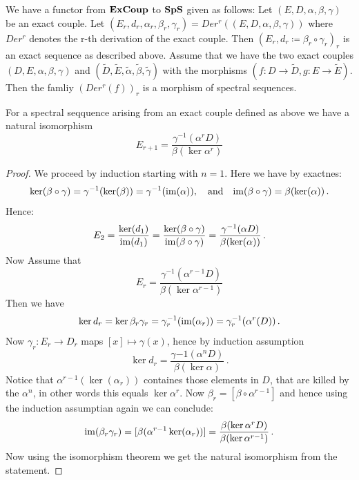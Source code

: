 \begin{corollary}
	We have a functor from $\operatorname{\mathbf{ExCoup}}$ to $\operatorname{\mathbf{SpS}}$ given as follows: Let $(E,D,\alpha,\beta,\gamma)$ be an exact couple. Let $(E_r,d_r,\alpha_r,\beta_r,\gamma_r)=Der^r((E,D,\alpha,\beta,\gamma))$ where $Der^r$ denotes the r-th derivation of the exact couple. Then $(E_r,d_r\coloneq \beta_r\circ \gamma_r)_r$ is an exact sequence as described above. Assume that we have the two exact couples $(D,E,\alpha,\beta,\gamma)$ and $(\widetilde{D},\widetilde{E},\widetilde{\alpha},\widetilde{\beta},\widetilde{\gamma})$ with the morphisms $(f:D\to \widetilde{D},g:E\to \widetilde{E})$. Then the famliy $(Der^r(f))_r$ is a morphism of spectral sequences.
\end{corollary}
\begin{corollary}\label{cor: explicit pages of exact sequences arising from exact couples}
	For a spectral seqquence arising from an exact couple defined as above we have a natural isomorphism
	\begin{equation*}
		E_{r+1}= \frac{\gamma^{-1}(\alpha^r D)}{\beta(\ker \alpha ^r)}
	\end{equation*}
\end{corollary}
\begin{proof}
	We proceed by induction starting with $n=1$.
	Here we have by exactnes:
	\begin{equation*}
		\ker(\beta \circ \gamma)=\gamma^{-1}(\ker(\beta))=\gamma^{-1}(\mathrm{im}(\alpha)),\quad \text{and}\quad
		\mathrm{im}(\beta\circ \gamma)=\beta(\ker(\alpha))\,.
	\end{equation*}
	Hence:
	\begin{equation*}
		E_2=\frac{\ker(d_1)}{\mathrm{im}(d_1)}=\frac{\ker(\beta\circ \gamma)}{\mathrm{im}(\beta \circ \gamma)}=\frac{\gamma^{-1}(\alpha D)}{\beta(\ker(\alpha))}\,.
	\end{equation*}
	Now Assume that
	\begin{equation*}
		E_r=\frac{\gamma^{-1}(\alpha^{r-1}D)}{\beta(\ker \alpha^{r-1})}
	\end{equation*}
	Then we have
	\begin{equation*}
		\ker{d_r}=\ker{\beta_r\gamma_r}=\gamma_r^{-1}(\mathrm{im}(\alpha_r))=\gamma_r^{-1}(\alpha^r(D))\,.
	\end{equation*} Now $\gamma_r:E_r\to D_r$ maps $[x]\mapsto \gamma(x)$, hence by induction assumption
	\begin{equation*}
		\ker{d_r}=\frac{\gamma{-1}(\alpha^nD)}{\beta(\ker \alpha)}\,.
	\end{equation*} Notice that $\alpha^{r-1}(\ker(\alpha_r))$ containes those elements in $D$, that are killed by the $\alpha^n$, in other words this equals $\ker \alpha^r$. Now $\beta_r=[\beta\circ \alpha^{r-1}]$ and hence using the induction assumptian again we can conclude:
	\begin{equation*}
		\mathrm{im}(\beta_r\gamma_r)=[\beta(\alpha^{r-1}\ker(\alpha_r))]=\frac{\beta(\ker\alpha^r D)}{\beta(\ker \alpha^{r-1})}\,.
	\end{equation*} Now using the isomorphism theorem we get the natural isomorphism from the statement.
\end{proof}



